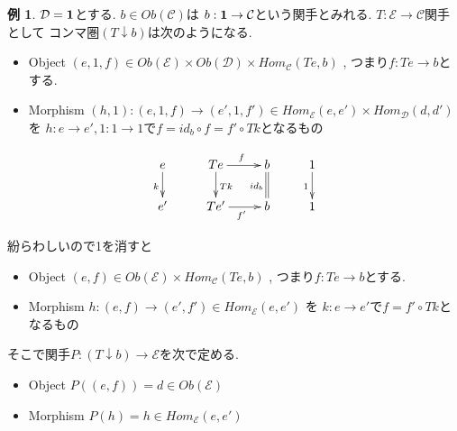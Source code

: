 \documentclass[dvipdfmx,a4paper,11pt]{report}
\theoremstyle{definition}
\newtheorem{exa}[thm]{例}
\begin{document}
\begin{exa}
$\mathcal{D}={\bf 1}$とする.
$b \in Ob(\mathcal{C})$は
$b :  {\bf 1} \to \mathcal{C}$という関手とみれる. 
$T : \mathcal{E} \to \mathcal{C}$関手として
コンマ圏$(T \downarrow b)$は次のようになる.
\begin{itemize}
\item Object $(e,1,f) \in Ob(\mathcal{E}) \times Ob(\mathcal{D}) \times Hom_{\mathcal{C}}(Te,b)$ , つまり$f :  Te \to b$とする. 
\item Morphism $(h,1) : (e,1,f)  \to (e',1,f') \in Hom_{\mathcal{E}}(e,e') \times Hom_{\mathcal{D}}(d,d')$ を $h: e \to e', 1 : 1 \to 1$で$f = id_b \circ f = f' \circ Tk $となるもの
\end{itemize}

\begin{equation*}
\xymatrix@C=25pt@R=20pt{
e \ar@{->}[d]_{k}
&Te  \ar@{->}[r]^{f} \ar@{->}[d]^{Tk} 
& b \ar@{=}[d]_{id_b}
&1\ar@{->}[d] _{1}\\
e'
&Te'\ar@{->}[r]_{f'} 
& b
&1 \\   
}
\end{equation*}

紛らわしいので1を消すと
\begin{itemize}
\item Object $(e,f) \in Ob(\mathcal{E}) \times Hom_{\mathcal{C}}(Te,b)$ , つまり$f : Te\to b$とする. 
\item Morphism $h : (e,f)  \to (e',f') \in Hom_{\mathcal{E}}(e,e') $ を 
$k: e \to e'$で$f = f' \circ Tk$となるもの
\end{itemize}

そこで関手$P : (T\downarrow b) \to \mathcal{E}$を次で定める. 
\begin{itemize}
\item Object $P((e,f)) = d \in Ob(\mathcal{E})$
\item Morphism $P(h) = h \in Hom_{\mathcal{E}}(e,e') $
\end{itemize}


\end{exa}
\end{document}
